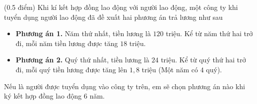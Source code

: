 \begin{bt}%
	(0.5 điểm) Khi kí kết hợp đồng lao động với người lao động, một công ty khi tuyển dụng người lao động đã đề xuất hai phương án trả lương như sau
	\begin{itemize}
		\item \textbf{Phương án 1.} Năm thứ nhất, tiền lương là $120$ triệu. Kể từ năm thứ hai trở đi, mỗi năm tiền lương được tăng $18$ triệu.
		\item \textbf{Phương án 2.} Quý thứ nhất, tiền lương là $24$ triệu. Kể từ quý thứ hai trở đi, mỗi quý tiền lương được tăng lên $1{,}8$ triệu (Một năm có $4$ quý).
	\end{itemize}
	Nếu là người được tuyển dụng vào công ty trên, em sẽ chọn phương án nào khi ký kết hợp đồng lao động $6$ năm.
\end{bt}

